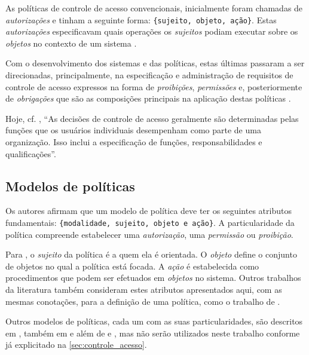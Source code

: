 As políticas de controle de acesso convencionais, inicialmente foram chamadas de \textit{autorizações} e tinham a seguinte forma: \verb|{sujeito, objeto, ação}|. Estas \textit{autorizações} especificavam quais operações os \textit{sujeitos} podiam executar sobre os \textit{objetos} no contexto de um sistema \cite{di_vimercati_policies_2005} \cite{sarkis2017}.

Com o desenvolvimento dos sistemas e das políticas, estas últimas passaram a ser direcionadas, principalmente, na especificação e administração de requisitos de controle de acesso expressos na forma de \textit{proibições}, \textit{permissões }e, posteriormente de \textit{obrigações} que são as composições principais na aplicação destas políticas \cite{sarkar_2017}.

Hoje, cf. , ``As decisões de controle de acesso geralmente são determinadas pelas funções que os usuários individuais desempenham como parte de uma organização. Isso inclui a especificação de funções, responsabilidades e qualificações''.

\subsection{Modelos de políticas}\label{modelo_politicas}
Os autores  afirmam que um modelo de política deve ter os seguintes atributos fundamentais: \verb|{modalidade, sujeito, objeto e ação}|. A particularidade da política compreende estabelecer uma \textit{autorização}, uma \textit{permissão} ou \textit{proibição}. 

Para , o \textit{sujeito }da política é a quem ela é orientada. O \textit{objeto} define o conjunto de objetos no qual a política está focada. A \textit{ação} é estabelecida como procedimentos que podem ser efetuados em \textit{objetos} no sistema. Outros trabalhos da literatura também consideram estes atributos apresentados aqui, com as mesmas conotações, para a definição de uma política, como o trabalho de  .

Outros modelos de políticas, cada um com as suas particularidades, são descritos em , também em  e  além de  e , mas não serão utilizados neste trabalho conforme já explicitado na \autoref{sec:controle_acesso}.

